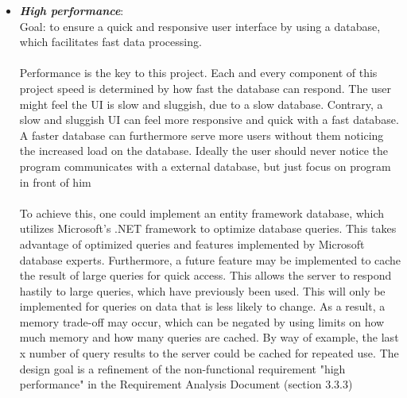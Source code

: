 \begin{itemize}
\item \textit{\bf{High performance}}: 
\\
Goal: to ensure a quick and responsive user interface by using a database, which facilitates fast data processing.  
\\\\
Performance is the key to this project. Each and every component of this project speed is determined by how fast the database can respond. The user might  feel the UI is slow and sluggish, due to a slow database. Contrary, a slow and sluggish UI can feel more responsive and quick with a fast database. A faster database can furthermore serve more users without them noticing the increased load on the database. Ideally the user should never notice the program communicates with a external database, but just focus on program in front of him
\\\\
To achieve this, one could implement an entity framework database, which utilizes Microsoft's .NET framework to optimize database queries. This takes advantage of optimized queries and features implemented by Microsoft database experts. Furthermore, a future feature may be implemented to cache the result of large queries for quick access. This allows the server to respond hastily to large queries, which have previously been used. This will only be implemented for queries on data that is less likely to change. As a result, a memory trade-off may occur, which can be negated by using limits on how much memory and how many queries are cached. By way of example, the last x number of query results to the server could be cached for repeated use. The design goal is a refinement of the non-functional requirement "high performance" in the Requirement Analysis Document (section 3.3.3)

\end{itemize}